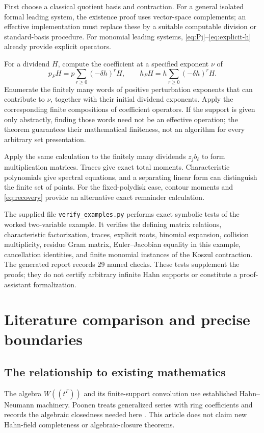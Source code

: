 \documentclass[11pt,letterpaper]{article}
\theoremstyle{definition}
\theoremstyle{remark}
\numberwithin{equation}{section}
\begin{document}
First choose a classical quotient basis and contraction. For a general isolated formal leading system, the existence proof uses vector-space complements; an effective implementation must replace these by a suitable computable division or standard-basis procedure. For monomial leading systems, \eqref{eq:Pj}--\eqref{eq:explicit-h} already provide explicit operators.

For a dividend $H$, compute the coefficient at a specified exponent $\nu$ of
\[
 p_FH=p\sum_{r\geq0}(-\delta h)^rH,
 \qquad
 h_FH=h\sum_{r\geq0}(-\delta h)^rH.
\]
Enumerate the finitely many words of positive perturbation exponents that can contribute to $\nu$, together with their initial dividend exponents. Apply the corresponding finite compositions of coefficient operators. If the support is given only abstractly, finding those words need not be an effective operation; the theorem guarantees their mathematical finiteness, not an algorithm for every arbitrary set presentation.

Apply the same calculation to the finitely many dividends $z_jb_\ell$ to form multiplication matrices. Traces give exact total moments. Characteristic polynomials give spectral equations, and a separating linear form can distinguish the finite set of points. For the fixed-polydisk case, contour moments and \eqref{eq:recovery} provide an alternative exact remainder calculation.

The supplied file \texttt{verify\_examples.py} performs exact symbolic tests of the worked two-variable example. It verifies the defining matrix relations, characteristic factorization, traces, explicit roots, binomial expansion, collision multiplicity, residue Gram matrix, Euler--Jacobian equality in this example, cancellation identities, and finite monomial instances of the Koszul contraction. The generated report records 29 named checks. These tests supplement the proofs; they do not certify arbitrary infinite Hahn supports or constitute a proof-assistant formalization.

\section{Literature comparison and precise boundaries}\label{sec:literature}
\subsection{The relationship to existing mathematics}
The algebra $W((t^\Gamma))$ and its finite-support convolution use established Hahn--Neumann machinery. Poonen treats generalized series with ring coefficients and records the algebraic closedness needed here \cite{Poonen}. This article does not claim new Hahn-field completeness or algebraic-closure theorems.
\end{document}
